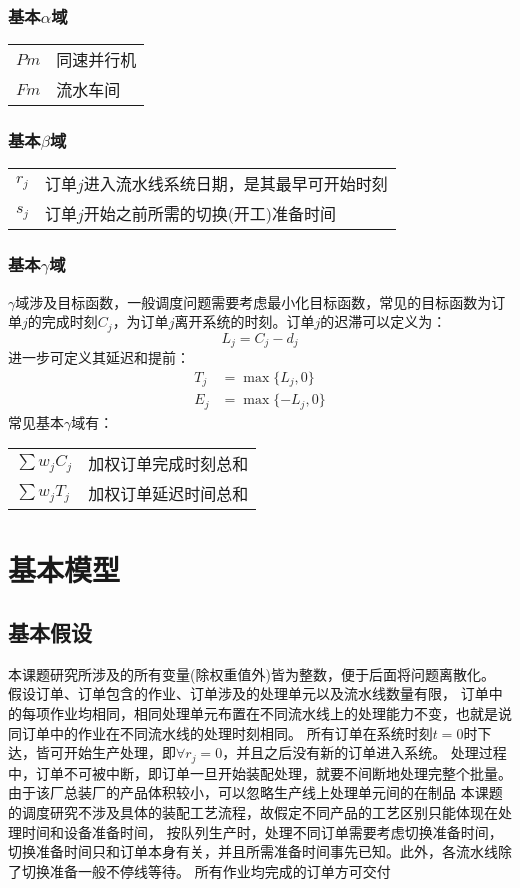 \subsubsection{基本$\alpha$域}
\begin{supertabular}{ll}
$Pm$ & 同速并行机\\
$Fm$ & 流水车间\\
\end{supertabular}

\subsubsection{基本$\beta$域}
\begin{supertabular}{ll}
$r_j$ & 订单$j$进入流水线系统日期，是其最早可开始时刻\\
$s_j$ & 订单$j$开始之前所需的切换(开工)准备时间\\
\end{supertabular}

\subsubsection{基本$\gamma$域}
$\gamma$域涉及目标函数，一般调度问题需要考虑最小化目标函数，常见的目标函数为订单$j$的完成时刻$C_j$，为订单$j$离开系统的时刻。订单$j$的迟滞可以定义为：
\[
L_j = C_j - d_j
\]
进一步可定义其延迟和提前：
\begin{align*}
T_j & = \max\{L_j,0\}\\
E_j & = \max\{-L_j,0\}
\end{align*}
常见基本$\gamma$域有：\\[3pt]
\begin{supertabular}{ll}
$\sum w_jC_j$ & 加权订单完成时刻总和 \\
$\sum w_jT_j$ & 加权订单延迟时间总和 \\
\end{supertabular}

\section{基本模型}
\subsection{基本假设}
本课题研究所涉及的所有变量(除权重值外)皆为整数，便于后面将问题离散化。
假设订单、订单包含的作业、订单涉及的处理单元以及流水线数量有限，
订单中的每项作业均相同，相同处理单元布置在不同流水线上的处理能力不变，也就是说同订单中的作业在不同流水线的处理时刻相同。
所有订单在系统时刻$t = 0$时下达，皆可开始生产处理，即$\forall r_j =0$，并且之后没有新的订单进入系统。
处理过程中，订单不可被中断，即订单一旦开始装配处理，就要不间断地处理完整个批量。
由于该厂总装厂的产品体积较小，可以忽略生产线上处理单元间的在制品
本课题的调度研究不涉及具体的装配工艺流程，故假定不同产品的工艺区别只能体现在处理时间和设备准备时间，
按队列生产时，处理不同订单需要考虑切换准备时间，切换准备时间只和订单本身有关，并且所需准备时间事先已知。此外，各流水线除了切换准备一般不停线等待。
所有作业均完成的订单方可交付

